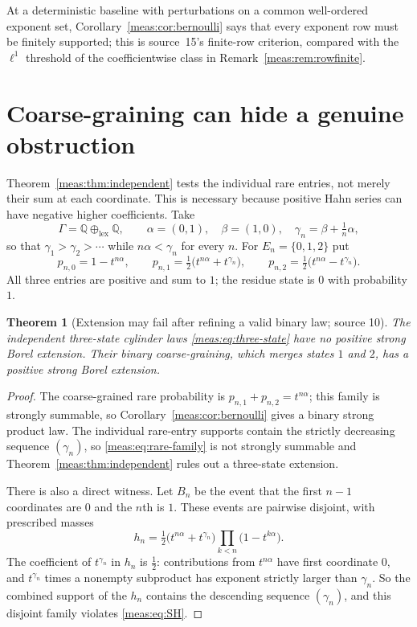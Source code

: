 \documentclass[11pt]{article}
\numberwithin{equation}{section}
\newtheorem{theorem}{Theorem}[section]
\theoremstyle{definition}
\theoremstyle{remark}
\newcommand{\Q}{\mathbb Q}
\begin{document}
At a deterministic baseline with perturbations on a common well-ordered
exponent set, Corollary~\ref{meas:cor:bernoulli} says that every exponent row
must be finitely supported; this is source~15's finite-row criterion, compared
with the $\ell^1$ threshold of the coefficientwise class in
Remark~\ref{meas:rem:rowfinite}.

\section{Coarse-graining can hide a genuine obstruction}\label{meas:sec:coarse}

Theorem~\ref{meas:thm:independent} tests the individual rare entries, not
merely their sum at each coordinate. This is necessary because positive Hahn
series can have negative higher coefficients. Take
\[
 \Gamma=\Q\oplus_{\mathrm{lex}}\Q,\qquad
 \alpha=(0,1),\quad\beta=(1,0),\quad \gamma_n=\beta+\tfrac1n\alpha,
\]
so that $\gamma_1>\gamma_2>\cdots$ while $n\alpha<\gamma_n$ for every $n$. For
$E_n=\{0,1,2\}$ put
\begin{equation}\label{meas:eq:three-state}
 p_{n,0}=1-t^{n\alpha},\qquad
 p_{n,1}=\tfrac12\bigl(t^{n\alpha}+t^{\gamma_n}\bigr),\qquad
 p_{n,2}=\tfrac12\bigl(t^{n\alpha}-t^{\gamma_n}\bigr).
\end{equation}
All three entries are positive and sum to $1$; the residue state is $0$ with
probability $1$.

\begin{theorem}[Extension may fail after refining a valid binary law;
source 10]\label{meas:thm:coarse}
The independent three-state cylinder laws \eqref{meas:eq:three-state} have no
positive strong Borel extension. Their binary coarse-graining, which merges
states $1$ and $2$, has a positive strong Borel extension.
\end{theorem}
\begin{proof}
The coarse-grained rare probability is $p_{n,1}+p_{n,2}=t^{n\alpha}$; this family
is strongly summable, so Corollary~\ref{meas:cor:bernoulli} gives a binary strong
product law. The individual rare-entry supports contain the strictly
decreasing sequence $(\gamma_n)$, so \eqref{meas:eq:rare-family} is not strongly
summable and Theorem~\ref{meas:thm:independent} rules out a three-state
extension.

There is also a direct witness. Let $B_n$ be the event that the first $n-1$
coordinates are $0$ and the $n$th is $1$. These events are pairwise disjoint,
with prescribed masses
\begin{equation}\label{meas:eq:direct-coarse}
 h_n=\tfrac12\bigl(t^{n\alpha}+t^{\gamma_n}\bigr)\prod_{k<n}\bigl(1-t^{k\alpha}\bigr).
\end{equation}
The coefficient of $t^{\gamma_n}$ in $h_n$ is $\frac12$: contributions from
$t^{n\alpha}$ have first coordinate $0$, and $t^{\gamma_n}$ times a nonempty
subproduct has exponent strictly larger than $\gamma_n$. So the combined
support of the $h_n$ contains the descending sequence $(\gamma_n)$, and this
disjoint family violates \eqref{meas:eq:SH}.
\end{proof}
\end{document}
